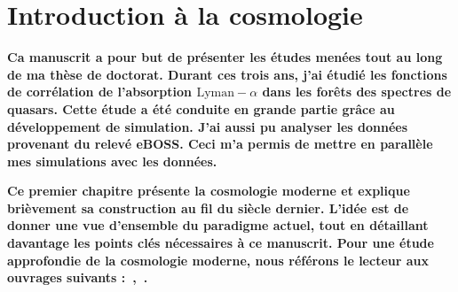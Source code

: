 % 

% 

\graphicspath{ {../figures/intro/} }

\chapter{Introduction à la cosmologie}
\minitoc
\newpage
\thispagestyle{fancy}
\textbf{
  Ca manuscrit a pour but de présenter les études menées tout au long de ma thèse de doctorat. Durant ces trois ans, j'ai étudié les fonctions de corrélation de l'absorption $\mathrm{Lyman-}\alpha$ dans les forêts des spectres de quasars. Cette étude a été conduite en grande partie grâce au développement de simulation. J'ai aussi pu analyser les données provenant du relevé eBOSS. Ceci m'a permis de mettre en parallèle mes simulations avec les données.
}


\textbf{
  Ce premier chapitre présente la cosmologie moderne et explique brièvement sa construction au fil du siècle dernier. L'idée est de donner une vue d'ensemble du paradigme actuel, tout en détaillant davantage les points clés nécessaires à ce manuscrit. Pour une étude approfondie de la cosmologie moderne, nous référons le lecteur aux ouvrages suivants :~\textcite{Rich2010},~\textcite{Dodelson2003}.
  }

